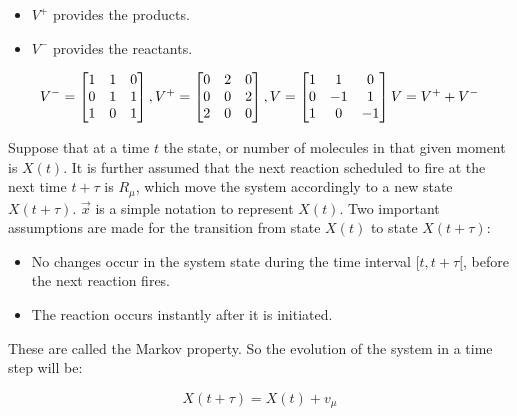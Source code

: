     \begin{multicols}{2}
      \begin{itemize}
        \item $V^+$ provides the products.
        \item $V^-$ provides the reactants.
      \end{itemize}
    \end{multicols}

    $$ V^- = \begin{bmatrix}1 & 1 & 0 \\ 0 & 1&1 \\ 1&0&1 \end{bmatrix}, V^+ = \begin{bmatrix}0 & 2 & 0 \\ 0 & 0&2 \\ 2&0&0 \end{bmatrix}, V = \begin{bmatrix}1 & 1 & 0 \\ 0 & -1&1 \\ 1&0&-1 \end{bmatrix}\\ V = V^+ + V^- $$

    Suppose that at a time $t$ the state, or number of molecules in that given moment is $X(t)$.
    It is further assumed that the next reaction scheduled to fire at the next time $t + \tau$ is $R _\mu$, which move the system accordingly to a new state $X(t + \tau)$.
    $\vec{x}$ is a simple notation to represent $X(t)$.
    Two important assumptions are made for the transition from state $X(t)$ to state $X(t+\tau)$:

    \begin{multicols}{2}
      \begin{itemize}
        \item No changes occur in the system state during the time interval $[t, t+\tau[$, before the next reaction fires.
        \item The reaction occurs instantly after it is initiated.
      \end{itemize}
    \end{multicols}

    These are called the Markov property.
    So the evolution of the system in a time step will be:

    $$ X(t+\tau) = X(t)+v_\mu $$

